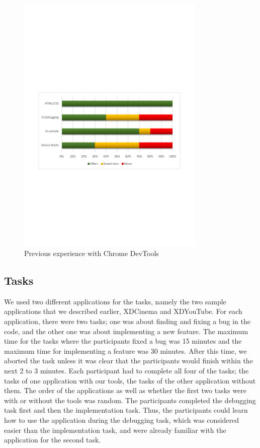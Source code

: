 \begin{figure}[H]
  \centering
    \includegraphics[width=0.8\textwidth]{images/charts/devtools_xp.pdf}
	\caption{Previous experience with Chrome DevTools}
	\label{fig:devtools_xp}
\end{figure}

\subsection{Tasks}

We used two different applications for the tasks, namely the two sample applications that we described earlier, XDCinema and XDYouTube. For each application, there were two tasks; one was about finding and fixing a bug in the code, and the other one was about implementing a new feature. The maximum time for the tasks where the participants fixed a bug was 15 minutes and the maximum time for implementing a feature was 30 minutes. After this time, we aborted the task unless it was clear that the participants would finish within the next 2 to 3 minutes. Each participant had to complete all four of the tasks; the tasks of one application with our tools, the tasks of the other application without them. The order of the applications as well as whether the first two tasks were with or without the tools was random. The participants completed the debugging task first and then the implementation task. Thus, the participants could learn how to use the application during the debugging task, which was considered easier than the implementation task, and were already familiar with the application for the second task.


